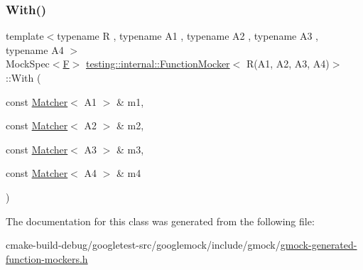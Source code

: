 \mbox{\label{classtesting_1_1internal_1_1FunctionMocker_3_01R_07A1_00_01A2_00_01A3_00_01A4_08_4_aee6e908e8409a52c44d3a8abd2bead99}} 
\subsubsection{\texorpdfstring{With()}{With()}}
{\footnotesize\ttfamily template$<$typename R , typename A1 , typename A2 , typename A3 , typename A4 $>$ \\
Mock\+Spec$<$\mbox{\hyperlink{classtesting_1_1internal_1_1FunctionMocker_3_01R_07A1_00_01A2_00_01A3_00_01A4_08_4_a9be04bb962edb1458c857ca8e9db9318}{F}}$>$ \mbox{\hyperlink{classtesting_1_1internal_1_1FunctionMocker}{testing\+::internal\+::\+Function\+Mocker}}$<$ R(A1, A2, A3, A4)$>$\+::With (\begin{DoxyParamCaption}\item[{const \mbox{\hyperlink{classtesting_1_1Matcher}{Matcher}}$<$ A1 $>$ \&}]{m1,  }\item[{const \mbox{\hyperlink{classtesting_1_1Matcher}{Matcher}}$<$ A2 $>$ \&}]{m2,  }\item[{const \mbox{\hyperlink{classtesting_1_1Matcher}{Matcher}}$<$ A3 $>$ \&}]{m3,  }\item[{const \mbox{\hyperlink{classtesting_1_1Matcher}{Matcher}}$<$ A4 $>$ \&}]{m4 }\end{DoxyParamCaption})\hspace{0.3cm}{\ttfamily [inline]}}



The documentation for this class was generated from the following file\+:\begin{DoxyCompactItemize}
\item 
cmake-\/build-\/debug/googletest-\/src/googlemock/include/gmock/\mbox{\hyperlink{gmock-generated-function-mockers_8h}{gmock-\/generated-\/function-\/mockers.\+h}}\end{DoxyCompactItemize}

